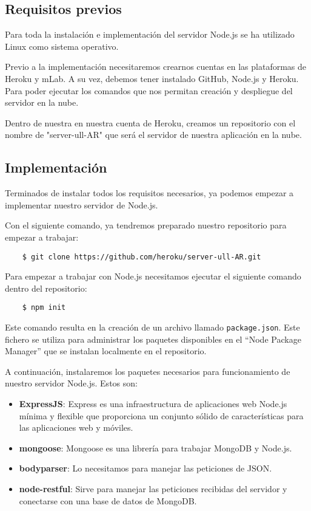 \subsection{Requisitos previos}
Para toda la instalación e implementación del servidor Node.js se ha utilizado Linux como sistema operativo.

Previo a la implementación necesitaremos crearnos cuentas en las plataformas de Heroku y mLab. A su vez, debemos tener instalado GitHub, Node.js y Heroku. Para poder ejecutar los comandos que nos permitan creación y despliegue del servidor en la nube.

Dentro de nuestra en nuestra cuenta de Heroku, creamos un repositorio con el nombre de "server-ull-AR" que será el servidor de nuestra aplicación en la nube.

\subsection{Implementación}

Terminados de instalar todos los requisitos necesarios, ya podemos empezar a implementar nuestro servidor de Node.js.

Con el siguiente comando, ya tendremos preparado nuestro repositorio para empezar a trabajar:

\begin{lstlisting}
    $ git clone https://github.com/heroku/server-ull-AR.git
\end{lstlisting}

Para empezar a trabajar con Node.js necesitamos ejecutar el siguiente comando dentro del repositorio:

\begin{lstlisting}
    $ npm init 
\end{lstlisting}

Este comando resulta en la creación de un archivo llamado \texttt{package.json}. Este fichero se utiliza para administrar los paquetes disponibles en el ``Node Package Manager'' que se instalan localmente en el repositorio.

A continuación, instalaremos los paquetes necesarios para funcionamiento de nuestro servidor Node.js. Estos son:

\begin{itemize}
    \item \textbf{ExpressJS}: Express es una infraestructura de aplicaciones web Node.js mínima y flexible que proporciona un conjunto sólido de características para las aplicaciones web y móviles.
    \item \textbf{mongoose}: Mongoose es una librería para trabajar MongoDB y Node.js.
    \item \textbf{bodyparser}: Lo necesitamos para manejar las peticiones de JSON.
    \item \textbf{node-restful}: Sirve para manejar las peticiones recibidas del servidor y conectarse con una base de datos de MongoDB.
\end{itemize}

